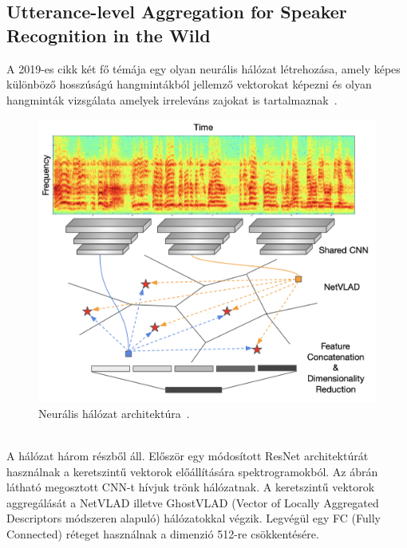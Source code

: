\newpage

\subsection{Utterance-level Aggregation for Speaker Recognition in the Wild}

A 2019-es cikk két fő témája egy olyan neurális hálózat létrehozása, amely képes különböző hosszúságú hangmintákból jellemző vektorokat képezni és olyan hangminták vizsgálata amelyek irreleváns zajokat is tartalmaznak~\cite{speaker_in_the_wild}.

\begin{figure}[!ht]
	\centering
	\includegraphics[width=150mm, keepaspectratio]{figures/frame-cnn.png}
	\caption{Neurális hálózat architektúra~\cite{speaker_in_the_wild}.}
	\label{fig:frame-cnn}
\end{figure}
\ \\
\newline
\newline
A hálózat három részből áll. Először egy módosított ResNet architektúrát használnak a keretszintű vektorok előállítására spektrogramokból. Az ábrán látható megosztott CNN-t hívjuk trönk hálózatnak. A keretszintű vektorok aggregálását a NetVLAD illetve GhostVLAD (Vector of Locally Aggregated Descriptors módszeren alapuló) hálózatokkal végzik. Legvégül egy FC (Fully Connected) réteget használnak a dimenzió 512-re csökkentésére.
\newline
\newline
